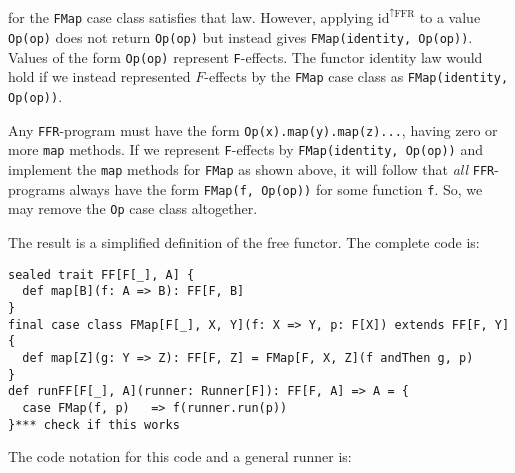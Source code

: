 for the \lstinline!FMap!
case class satisfies that law. However, applying $\text{id}^{\uparrow\text{FFR}}$
to a value \lstinline!Op(op)!
does not return \lstinline!Op(op)!
but instead gives \lstinline!FMap(identity, Op(op))!.
Values of the form \lstinline!Op(op)!
represent \lstinline!F!-effects.
The functor identity law would hold if we instead represented $F$-effects
by the \lstinline!FMap!
case class as \lstinline!FMap(identity, Op(op))!.

Any \lstinline!FFR!-program
must have the form \lstinline!Op(x).map(y).map(z)...!,
having zero or more \lstinline!map!
methods. If we represent \lstinline!F!-effects
by \lstinline!FMap(identity, Op(op))!
and implement the \lstinline!map!
methods for \lstinline!FMap!
as shown above, it will follow that \emph{all} \lstinline!FFR!-programs
always have the form \lstinline!FMap(f, Op(op))!
for some function \lstinline!f!.
So, we may remove the \lstinline!Op!
case class altogether.

The result is a simplified definition of the free functor. The complete
code is:
\begin{lstlisting}
sealed trait FF[F[_], A] {
  def map[B](f: A => B): FF[F, B]
}
final case class FMap[F[_], X, Y](f: X => Y, p: F[X]) extends FF[F, Y] {
  def map[Z](g: Y => Z): FF[F, Z] = FMap[F, X, Z](f andThen g, p)
}
def runFF[F[_], A](runner: Runner[F]): FF[F, A] => A = {
  case FMap(f, p)   => f(runner.run(p))
}*** check if this works
\end{lstlisting}
The code notation for this code and a general runner is:

